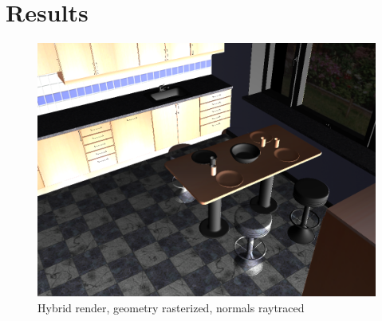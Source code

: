 \section{Results}

\begin{figure}[H]
	\centering
	\includegraphics[width=1.00\textwidth]{Media/hybrid.png}
	\caption{Hybrid render, geometry rasterized, normals raytraced}
	\label{fig:hybrid_image01}
\end{figure}
